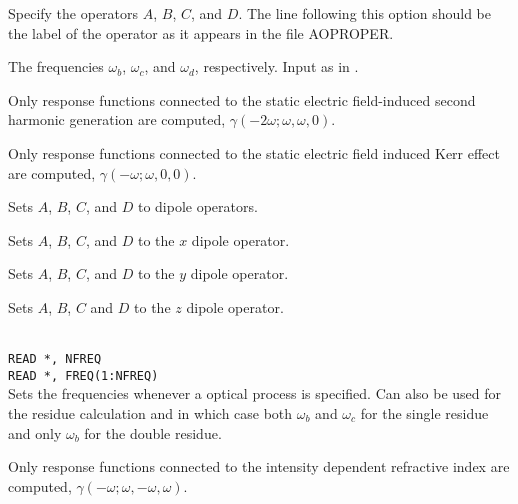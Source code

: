 \begin{description}

\item[, , , ]
Specify the operators $A$, $B$, $C$, and $D$. The line following this
option should be the label of the operator as it appears in the file
AOPROPER.

\item[, , ]
The frequencies
$\omega_b$, $\omega_c$, and $\omega_d$, respectively. Input as in
.

\item{}
Only response functions connected to the static electric field-induced
second harmonic generation are computed,
$\gamma(-2\omega;\omega,\omega,0)$.

\item{}
Only response functions connected to the static electric field induced
Kerr effect are computed,
$\gamma(-\omega;\omega,0,0)$.

\item{}
Sets $A$, $B$, $C$, and $D$ to dipole operators.

\item{}
Sets $A$, $B$, $C$, and $D$ to the $x$ dipole operator.

\item{}
Sets $A$, $B$, $C$, and $D$ to the $y$ dipole operator.

\item{}
Sets $A$, $B$, $C$ and $D$ to the $z$ dipole operator.

\item{}\\
\verb|READ *, NFREQ|\\
\verb|READ *, FREQ(1:NFREQ)|\\
Sets the frequencies whenever a optical process is specified.
Can also be used for the residue calculation and in which case
both $\omega_b$ and $\omega_c$ for the single residue and only
$\omega_b$ for the double residue.

\item{}
Only response functions connected to the intensity dependent
refractive index are computed,
$\gamma(-\omega;\omega,-\omega,\omega)$.


\end{description}
